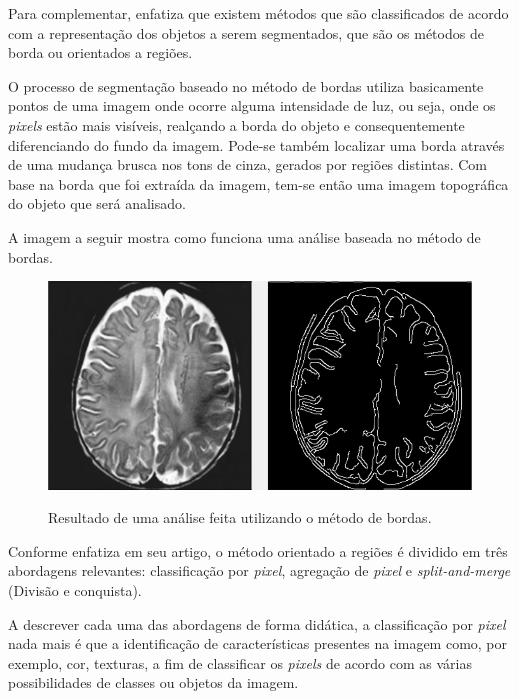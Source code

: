 Para complementar,  enfatiza que existem métodos que são classificados de acordo com a representação dos objetos a serem segmentados, que são os métodos de borda ou orientados a regiões.

O processo de segmentação baseado no método de bordas utiliza basicamente pontos de uma imagem onde ocorre alguma intensidade de luz, ou seja, onde os \textit{pixels} estão mais visíveis, realçando a borda do objeto e consequentemente diferenciando do fundo da imagem. Pode-se também localizar uma borda através de uma mudança brusca nos tons de cinza, gerados por regiões distintas. Com base na borda que foi extraída da imagem, tem-se então uma imagem topográfica do objeto que será analisado.

A imagem a seguir mostra como funciona uma análise baseada no método de bordas.


\begin{figure}[!htb]
\caption{{\footnotesize Resultado de uma análise feita utilizando o método de bordas.}}
 
\centering %
\includegraphics[width=12cm]{revisao-bibliografica/Figuras/MetodoDeBorda.png}%
\label{figura:figura6}

\centering {}
{
\label{figura:figura6}
}
\end{figure}

Conforme  enfatiza em seu artigo, o método orientado a regiões é dividido em três abordagens relevantes: classificação por \textit{pixel}, agregação de \textit{pixel} e \textit{split-and-merge} (Divisão e conquista).

A descrever cada uma das abordagens de forma didática, a classificação por \textit{pixel} nada mais é que a identificação de características presentes na imagem como, por exemplo, cor, texturas, a fim de classificar os \textit{pixels} de acordo com as várias possibilidades de classes ou objetos da imagem.

